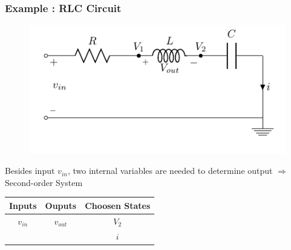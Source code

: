 \begin{frame}
	\frametitle{Example : RLC Circuit}
	
	\begin{figure}
		\centering
		\includegraphics[width=0.7\linewidth]{img/circuit-RLC}
		\label{fig:circuit-RLC}
	\end{figure}
	Besides input $v_{in}$, two internal variables are needed to determine output $\Rightarrow$ Second-order System
	\begin{center}
		\begin{tabular}{c@{\hskip 1cm} c@{\hskip 1cm} c}
			Inputs 	& Ouputs 	& Choosen States \\ \hline
			$v_{in}$ 	& $v_{out}$	& $V_2$ \\
			& & $i$ \\ 
		\end{tabular}
	\end{center}
	
\end{frame}

